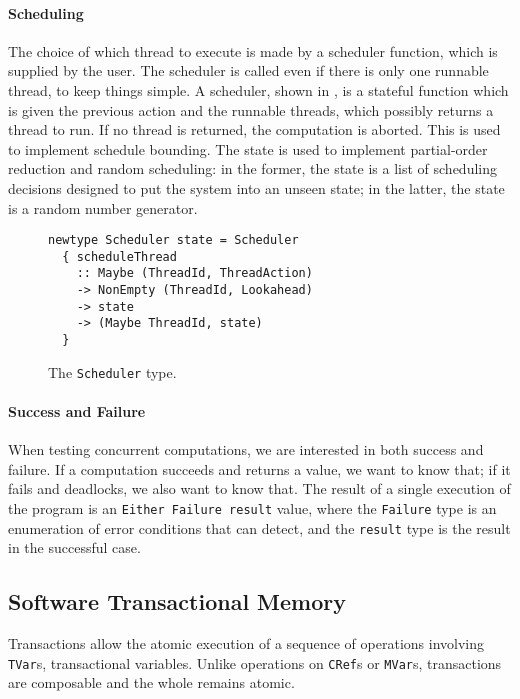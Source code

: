 \paragraph{Scheduling}
The choice of which thread to execute is made by a scheduler function, which is
supplied by the user.  The scheduler is called even if there is only one
runnable thread, to keep things simple.  A scheduler, shown in
, is a stateful function which is given the previous action
and the runnable threads, which possibly returns a thread to run.  If no thread
is returned, the computation is aborted.  This is used to implement schedule
bounding.  The state is used to implement partial-order reduction and random
scheduling: in the former, the state is a list of scheduling decisions designed
to put the system into an unseen state; in the latter, the state is a random
number generator.

\begin{figure}[t]
  \centering
  \begin{lstlisting}
newtype Scheduler state = Scheduler
  { scheduleThread
    :: Maybe (ThreadId, ThreadAction)
    -> NonEmpty (ThreadId, Lookahead)
    -> state
    -> (Maybe ThreadId, state)
  }
  \end{lstlisting}
  \caption{The \texttt{Scheduler} type.}
  \label{fig:scheduler}
\end{figure}

\paragraph{Success and Failure}
When testing concurrent computations, we are interested in both
success and failure.  If a computation succeeds and returns a value,
we want to know that; if it fails and deadlocks, we also want to know
that.  The result of a single execution of the program is an
\verb|Either Failure result| value, where the \verb|Failure| type is
an enumeration of error conditions that \dejafu{} can detect, and the
\verb|result| type is the result in the successful case.

\subsection{Software Transactional Memory}

Transactions allow the atomic execution of a sequence of operations involving
\verb|TVar|s, transactional variables.  Unlike operations on \verb|CRef|s or
\verb|MVar|s, transactions are composable and the whole remains atomic.

